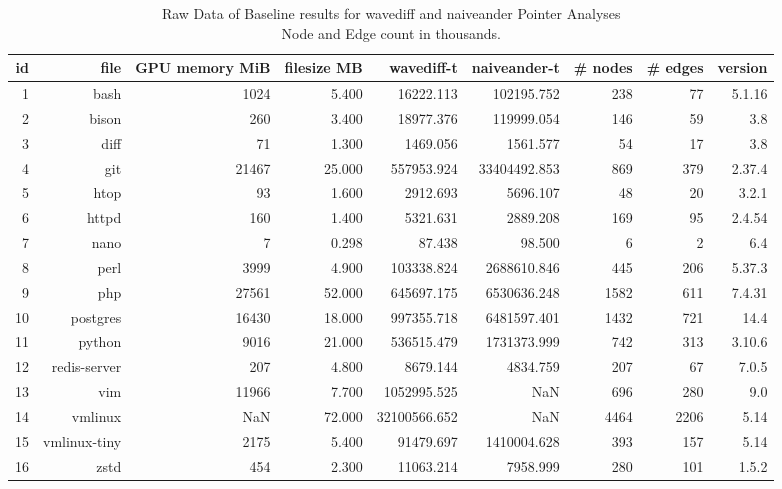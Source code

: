 \begin{table}[ht]
    \tiny
    \begin{tabular}{rrrrrrrrr}
        \toprule
        id & file         & GPU memory MiB & filesize MB & wavediff-t   & naiveander-t & \# nodes & \# edges & version \\
        \midrule
        1  & bash         & 1024           & 5.400       & 16222.113    & 102195.752   & 238      & 77       & 5.1.16  \\
        2  & bison        & 260            & 3.400       & 18977.376    & 119999.054   & 146      & 59       & 3.8     \\
        3  & diff         & 71             & 1.300       & 1469.056     & 1561.577     & 54       & 17       & 3.8     \\
        4  & git          & 21467          & 25.000      & 557953.924   & 33404492.853 & 869      & 379      & 2.37.4  \\
        5  & htop         & 93             & 1.600       & 2912.693     & 5696.107     & 48       & 20       & 3.2.1   \\
        6  & httpd        & 160            & 1.400       & 5321.631     & 2889.208     & 169      & 95       & 2.4.54  \\
        7  & nano         & 7              & 0.298       & 87.438       & 98.500       & 6        & 2        & 6.4     \\
        8  & perl         & 3999           & 4.900       & 103338.824   & 2688610.846  & 445      & 206      & 5.37.3  \\
        9  & php          & 27561          & 52.000      & 645697.175   & 6530636.248  & 1582     & 611      & 7.4.31  \\
        10 & postgres     & 16430          & 18.000      & 997355.718   & 6481597.401  & 1432     & 721      & 14.4    \\
        11 & python       & 9016           & 21.000      & 536515.479   & 1731373.999  & 742      & 313      & 3.10.6  \\
        12 & redis-server & 207            & 4.800       & 8679.144     & 4834.759     & 207      & 67       & 7.0.5   \\
        13 & vim          & 11966          & 7.700       & 1052995.525  & NaN          & 696      & 280      & 9.0     \\
        14 & vmlinux      & NaN            & 72.000      & 32100566.652 & NaN          & 4464     & 2206     & 5.14    \\
        15 & vmlinux-tiny & 2175           & 5.400       & 91479.697    & 1410004.628  & 393      & 157      & 5.14    \\
        16 & zstd         & 454            & 2.300       & 11063.214    & 7958.999     & 280      & 101      & 1.5.2   \\
        \bottomrule
    \end{tabular}

    \caption[Raw Data of Baseline results for wavediff and naiveander Pointer Analyses]{Raw Data of Baseline results for wavediff and naiveander Pointer Analyses\\Node and Edge count in thousands.}
\end{table}

